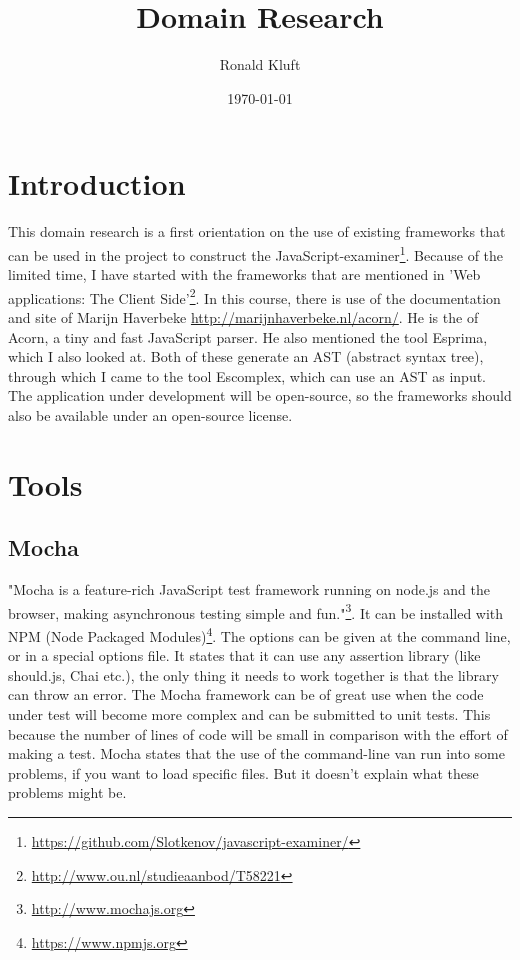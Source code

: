 \documentclass{article}
\begin{document}
\title{Domain Research}
\author{Ronald Kluft}
\date{\today}
\maketitle

\section{Introduction}
This domain research is a first orientation on the use of existing frameworks that can be used in the 
project to construct the JavaScript-examiner\footnote{\url{https://github.com/Slotkenov/javascript-examiner/}}.
Because of the limited time, I have started with the frameworks that are mentioned in 
'Web applications: The Client Side'\footnote{\url{http://www.ou.nl/studieaanbod/T58221}}.
In this course, there is use of the documentation and site of Marijn Haverbeke \url{http://marijnhaverbeke.nl/acorn/}.
He is the of Acorn, a tiny and fast JavaScript parser. He also mentioned the tool Esprima, which I also looked at.
Both of these generate an AST (abstract syntax tree), through which I came to the tool Escomplex, which can use an AST as input.
The application under development will be open-source, so the frameworks should also be available
under an open-source license.

\section{Tools}

\subsection{Mocha}
"Mocha is a feature-rich JavaScript test framework running on node.js and the 
browser, making asynchronous testing simple and fun."\footnote{\url{http://www.mochajs.org}}.
It can be installed with NPM (Node Packaged Modules)\footnote{\url{https://www.npmjs.org}}.
The options can be given at the command line, or in a special options file.
It states that it can use any assertion library (like should.js, Chai etc.), 
the only thing it needs to work together is that the library can throw an error.
The Mocha framework can be of great use when the code under test will become more complex and can be submitted to unit tests.
This because the number of lines of code will be small in comparison with the effort of making a test.
Mocha states that the use of the command-line van run into some problems, if you want to load specific files. 
But it doesn't explain what these problems might be.
\end{document}
